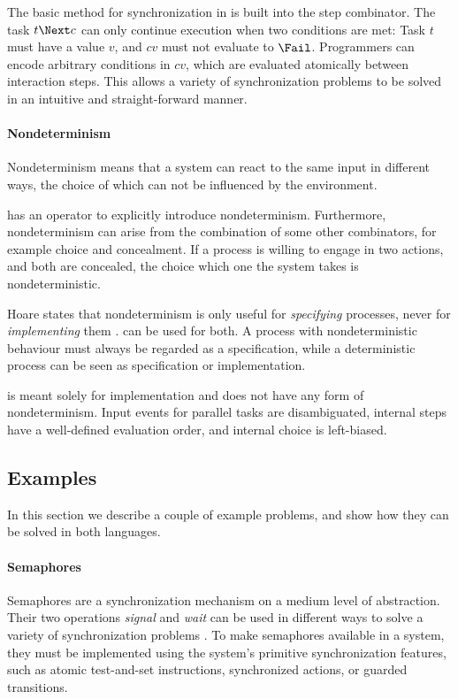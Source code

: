 The basic method for synchronization in \TOP is built into the step combinator.
The task $t \Next c$ can only continue execution when two conditions are met:
Task $t$ must have a value $v$, and $cv$ must not evaluate to $\Fail$.
Programmers can encode arbitrary conditions in $cv$, which are evaluated atomically between interaction steps.
This allows a variety of synchronization problems to be solved in an intuitive and straight-forward manner.


\paragraph{Nondeterminism}

Nondeterminism means that a system can react to the same input in different ways, the choice of which can not be influenced by the environment.

\CSP has an operator to explicitly introduce nondeterminism.
Furthermore, nondeterminism can arise from the combination of some other combinators, for example choice and concealment.
If a process is willing to engage in two actions, and both are concealed, the choice which one the system takes is nondeterministic.

Hoare states that nondeterminism is only useful for \emph{specifying} processes, never for \emph{implementing} them \cite{books/Hoare85CSP}.
\CSP can be used for both.
A process with nondeterministic behaviour must always be regarded as a specification, while a deterministic process can be seen as specification or implementation.

\TOP is meant solely for implementation and does not have any form of nondeterminism.
Input events for parallel tasks are disambiguated, internal steps have a well-defined evaluation order, and internal choice is left-biased.


\subsection{Examples}

In this section we describe a couple of example problems, and show how they can be solved in both languages.




\paragraph{Semaphores}

Semaphores are a synchronization mechanism on a medium level of abstraction.
Their two operations \emph{signal} and \emph{wait} can be used in different ways to solve a variety of synchronization problems \cite{books/Downey08LBOS}.
To make semaphores available in a system, they must be implemented using the system's primitive synchronization features, such as atomic test-and-set instructions, synchronized actions, or guarded transitions.

